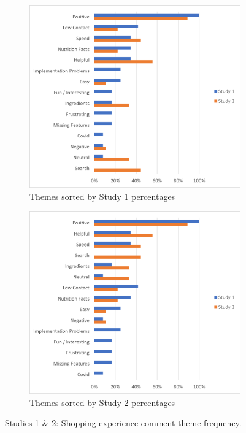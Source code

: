 \documentclass[thesis]{fputhesis}
\begin{document}
\begin{body}
\begin{figure}[h!]
    \centering
    \begin{subfigure}[]{.45\textwidth}
        \centering
        \includegraphics[width=\textwidth]{Images/experience themes study 1.png}
        \caption{Themes sorted by Study 1 percentages}
        \label{fig:exp-themes-study1}
    \end{subfigure}
    \begin{subfigure}[]{.45\textwidth}
        \centering
        \includegraphics[width=\textwidth]{Images/experience themes study 2.png}
        \caption{Themes sorted by Study 2 percentages}
        \label{fig:exp-themes-study2}
    \end{subfigure}
    \caption{Studies 1 \& 2: Shopping experience comment theme frequency.}
    \label{fig:experience-themes}
\end{figure}


\end{body}
\end{document}
